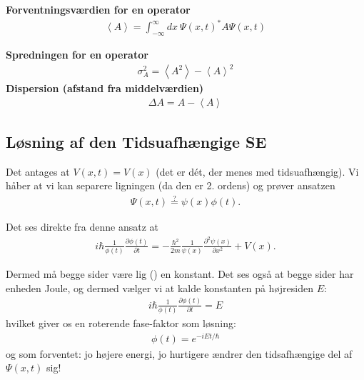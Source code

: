 \textbf{Forventningsværdien for en operator} 
\begin{align*}
    \left\langle A \right\rangle = \int _{- \infty} ^{\infty} d x \  \Psi (x, t)^{\ast} A \Psi (x, t)
\end{align*} 

\textbf{Spredningen for en operator} 
\begin{align*}
    \sigma _A ^{2} = \left\langle A^{2}  \right\rangle - \left\langle A \right\rangle ^{2} 
\end{align*}
\textbf{Dispersion (afstand fra middelværdien)}
\begin{align*}
    \Delta A = A - \left\langle A \right\rangle 
\end{align*} 

\subsection{Løsning af den Tidsuafhængige SE}
Det antages at \(V(x, t) = V(x)\) (det er dét, der menes med tidsuafhængig). Vi håber at vi kan separere ligningen (da den er 2. ordens) og prøver ansatzen \begin{align*}
    \Psi (x, t) \overset{?}{=} \psi (x) \phi (t).
\end{align*}

Det ses direkte fra denne ansatz at \begin{align*}
    i \hbar  \frac{1}{\phi (t)} \frac{\partial \phi (t)}{\partial t} = - \frac{\hbar ^{2} }{2m} \frac{1}{\psi (x)} \frac{\partial ^{2} \psi (x)}{\partial x ^{2} } + V(x) .
\end{align*}

Dermed må begge sider være lig () en konstant. Det ses også at begge sider har enheden Joule, og dermed vælger vi at kalde konstanten på højresiden \(E\): \begin{align*}
    i \hbar \frac{1}{\phi (t)} \frac{\partial \phi (t)}{\partial t} = E
\end{align*}  
hvilket giver os en roterende fase-faktor som løsning:
\begin{align*}
    \boxed{\phi (t) = e^{- i Et / \hbar }}
\end{align*}
og som forventet: jo højere energi, jo hurtigere ændrer den tidsafhængige del af \(\Psi (x, t)\) sig!


